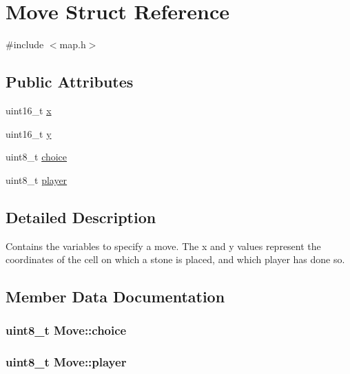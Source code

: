 \hypertarget{struct_move}{}\section{Move Struct Reference}
\label{struct_move}


{\ttfamily \#include $<$map.\+h$>$}

\subsection*{Public Attributes}
\begin{DoxyCompactItemize}
\item 
uint16\+\_\+t \hyperlink{struct_move_ac8bb71aa16911ca5811ff0025a3a7ed0}{x}
\item 
uint16\+\_\+t \hyperlink{struct_move_a8e7814eb7fbc1e478ed33e94261c24f2}{y}
\item 
uint8\+\_\+t \hyperlink{struct_move_a54a542b88c87db9ecb0c5531c1e2126b}{choice}
\item 
uint8\+\_\+t \hyperlink{struct_move_acdd1ca77f3eb54947461726588c49db7}{player}
\end{DoxyCompactItemize}


\subsection{Detailed Description}
Contains the variables to specify a move. The x and y values represent the coordinates of the cell on which a stone is placed, and which player has done so. 

\subsection{Member Data Documentation}
\subsubsection[{\texorpdfstring{choice}{choice}}]{\setlength{\rightskip}{0pt plus 5cm}uint8\+\_\+t Move\+::choice}\hypertarget{struct_move_a54a542b88c87db9ecb0c5531c1e2126b}{}\label{struct_move_a54a542b88c87db9ecb0c5531c1e2126b}
\subsubsection[{\texorpdfstring{player}{player}}]{\setlength{\rightskip}{0pt plus 5cm}uint8\+\_\+t Move\+::player}\hypertarget{struct_move_acdd1ca77f3eb54947461726588c49db7}{}\label{struct_move_acdd1ca77f3eb54947461726588c49db7}
